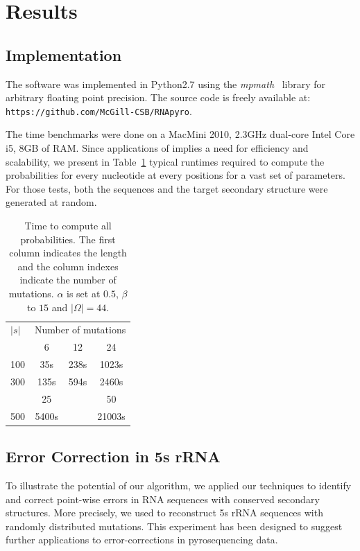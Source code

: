 \section{Results}
\label{sec:results}

\subsection{Implementation}
The software was implemented in Python2.7 using the \textit{mpmath}~\cite{mpmath} library
for  arbitrary floating point precision. The source code is freely available at: \\\verb+https://github.com/McGill-CSB/RNApyro+.

The time benchmarks were done on a MacMini 2010, 2.3GHz dual-core Intel Core i5, 8GB of RAM.
Since applications of \RNApyro implies a need for
 efficiency and scalability, we present in Table~\ref{tab:time} typical runtimes required to compute the probabilities for  every nucleotide at every positions for a vast set of parameters. For those tests,
 both the sequences and the target secondary structure were generated at random.

\begin{table}[t]
\begin{center}
\begin{tabular}{lccc}
$|s|$&\multicolumn{3}{c}{Number of mutations}\\\cline{2-4}
		 			  & 6   &  12  & 24\\\cline{2-4}
100  				& 35s  & 238s & 1023s\\
300  			& 135s & 594s &2460s\\\cline{2-4}
		 						& 25   &    &	50		\\\cline{2-4}
500         & 5400s&       &  21003s    \\
\end{tabular}
\end{center}
\caption{Time to compute all probabilities. The first column indicates the length and  the column indexes indicate the number
 of mutations. $\alpha$ is
set at $0.5$,  $\beta$ to $15$ and $|\Omega|=44$.}
\label{tab:time}
\end{table}


\subsection{Error Correction in 5s rRNA}

To illustrate the potential of our algorithm, we applied our techniques to identify and correct point-wise errors in RNA sequences
with conserved secondary structures. More precisely, we used \RNApyro to reconstruct 5s rRNA sequences with randomly distributed
mutations. This experiment has been designed to suggest further applications to error-corrections in pyrosequencing data.

